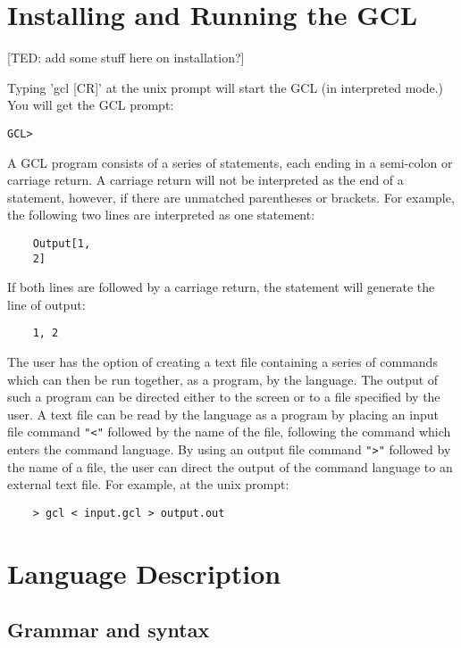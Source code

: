 \section{Installing and Running the GCL}

[TED: add some stuff here on installation?]

Typing 'gcl [CR]' at the unix prompt will start the GCL (in
interpreted mode.)  You will get the
GCL prompt:
\begin{verbatim}
GCL>
\end{verbatim}

A GCL program consists of a series of statements, each ending in a
semi-colon or carriage return. A carriage return will not be
interpreted as the end of a statement, however, if there are unmatched
parentheses or brackets.  For example, the following two lines are
interpreted as one statement:

\begin{verbatim}
	Output[1, 
	2]
\end{verbatim}

If both lines are followed by a carriage return, the statement will
generate the line of output:

\begin{verbatim}
	1, 2
\end{verbatim}

The user has the option of creating a text file containing a series of
commands which can then be run together, as a program, by the
language.  The output of such a program can be directed either to the
screen or to a file specified by the user.  A text file can be read by
the language as a program by placing an input file command {\tt "<"}
followed by the name of the file, following the command which enters
the command language.  By using an output file command {\tt ">"}
followed by the name of a file, the user can direct the output of the
command language to an external text file.  For example, at the unix prompt:

\begin{verbatim}
	> gcl < input.gcl > output.out
\end{verbatim}

\section{Language Description}

\subsection{Grammar and syntax}

